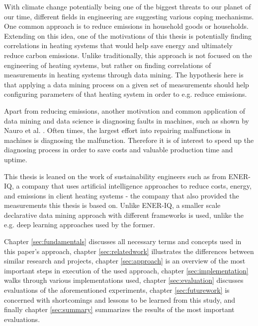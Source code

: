 \documentclass[bachelor,english]{info1thesis}
\begin{document}
With climate change potentially being one of the biggest threats \cite{bickton2016climate} to our planet of our time, different fields in engineering are suggesting various coping mechanisms. One common approach is to reduce emissions in household goods or households. Extending on this idea, one of the motivations of this thesis is potentially finding correlations in heating systems that would help save energy and ultimately reduce carbon emissions. Unlike traditionally, this approach is not focused on the engineering of heating systems, but rather on finding correlations of measurements in heating systems through data mining. The hypothesis here is that applying a data mining process on a given set of measurements should help configuring parameters of that heating system in order to e.g. reduce emissions.

Apart from reducing emissions, another motivation and common application of data mining and data science is diagnosing faults in machines, such as shown by Nauro et al. \cite{naruo1990development}. Often times, the largest effort into repairing malfunctions in machines is diagnosing the malfunction. Therefore it is of interest to speed up the diagnosing process in order to save costs and valuable production time and uptime.

This thesis is leaned on the work of sustainability engineers such as from ENER-IQ, a company that uses artificial intelligence approaches to reduce costs, energy, and emissions in client heating systems - the company that also provided the measurements this thesis is based on. Unlike ENER-IQ, a smaller scale declarative data mining approach with different frameworks is used, unlike the e.g. deep learning approaches used by the former.

Chapter \ref{sec:fundamentals} discusses all necessary terms and concepts used in this paper's approach, chapter \ref{sec:relatedwork} illustrates the differences between similar research and projects, chapter \ref{sec:approach} is an overview of the most important steps in execution of the used approach, chapter \ref{sec:implementation} walks through various implementations used, chapter \ref{sec:evaluation} discusses evaluations of the aforementioned experiments, chapter \ref{sec:futurework} is concerned with shortcomings and lessons to be learned from this study, and finally chapter \ref{sec:summary} summarizes the results of the most important evaluations.
\end{document}
